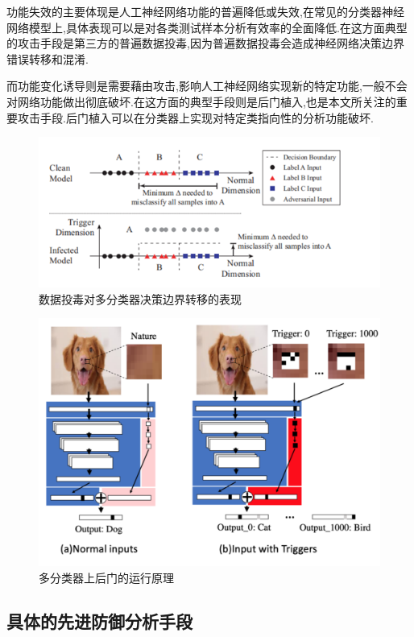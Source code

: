 功能失效的主要体现是人工神经网络功能的普遍降低或失效,在常见的分类器神经网络模型上,具体表现可以是对各类测试样本分析有效率的全面降低.在这方面典型的攻击手段是第三方的普遍数据投毒,因为普遍数据投毒会造成神经网络决策边界错误转移和混淆.

而功能变化诱导则是需要藉由攻击,影响人工神经网络实现新的特定功能,一般不会对网络功能做出彻底破坏.在这方面的典型手段则是后门植入,也是本文所关注的重要攻击手段.后门植入可以在分类器上实现对特定类指向性的分析功能破坏.


\begin{figure}
	\includegraphics[scale=0.5]{Figures/toudu.png}
	\caption{数据投毒对多分类器决策边界转移的表现}
\end{figure}
\begin{figure}
	\includegraphics[scale=0.5]{Figures/houmen.png}
	\caption{多分类器上后门的运行原理}
\end{figure}
\subsection{具体的先进防御分析手段}

